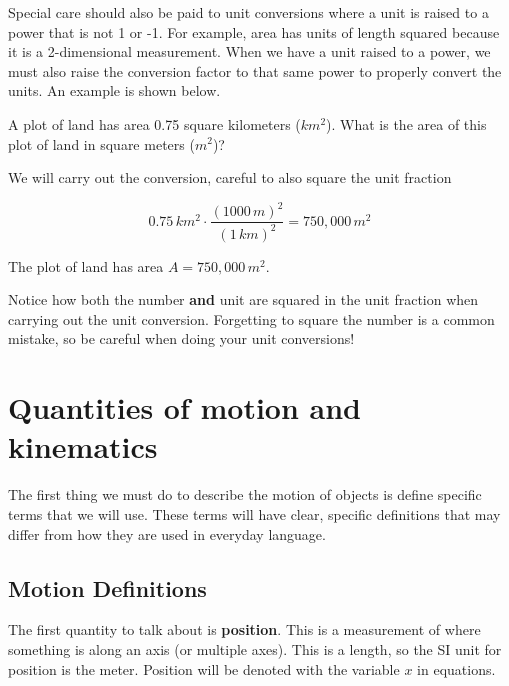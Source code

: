 \documentclass[12pt]{book}
\begin{document}
Special care should also be paid to unit conversions where a unit is raised to a power that is not 1 or -1. For example, area has units of length squared because it is a 2-dimensional measurement. When we have a unit raised to a power, we must also raise the conversion factor to that same power to properly convert the units. An example is shown below.

\begin{exampleblock}

A plot of land has area 0.75 square kilometers ($km^2$). What is the area of this plot of land in square meters ($m^2$)?

\hspace{10pt}

We will carry out the conversion, careful to also square the unit fraction

\begin{equation}
0.75 \, km^2 \cdot \frac{(1000 \, m)^2}{(1 \, km)^2} = 750,000 \, m^2
\end{equation}

The plot of land has area $A = 750,000 \, m^2$.

\end{exampleblock}

Notice how both the number \textbf{and} unit are squared in the unit fraction when carrying out the unit conversion. Forgetting to square the number is a common mistake, so be careful when doing your unit conversions!

\chapter{Quantities of motion and kinematics}
\setcounter{example}{1}
\addtocounter{chp}{1}

The first thing we must do to describe the motion of objects is define specific terms that we will use. These terms will have clear, specific definitions that may differ from how they are used in everyday language. 

\section{Motion Definitions}

The first quantity to talk about is \textbf{position}. This is a measurement of where something is along an axis (or multiple axes). This is a length, so the SI unit for position is the meter. Position will be denoted with the variable $x$ in equations.
\end{document}
